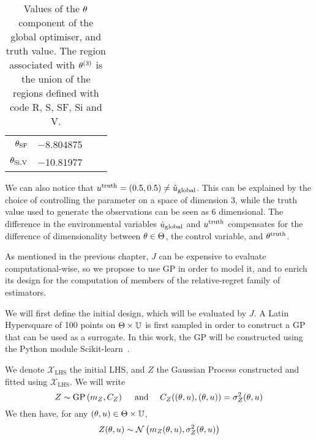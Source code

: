 \documentclass[../../Main_ManuscritThese.tex]{subfiles}
\begin{document}
\begin{table}[!h]
\begin{tabular}{rrrr}
    $\theta_{\mathrm{SF}}$   & \num[round-mode=places,round-precision=4]{-8.804875}                                                                                                                                                                                                                                        &                          &                                                                         \\
    $\theta_{\mathrm{Si,V}}$ & \num[round-mode=places,round-precision=4]{-10.81977}                                                                                                                                                                                                                                        &                          &                                                                         \\ \bottomrule
  \end{tabular}
  \caption[Values of the $\kk$ component of the global optimiser, and
  truth value]{\label{tab:ktruthkopt} Values of the $\kk$ component of
    the global optimiser, and truth value. The region associated with
    $\theta^{(3)}$ is the union of the regions defined with code R, S,
    SF, Si and V.}
\end{table}
We can also notice that
$u^{\mathrm{truth}}=(\num{0.5},\num{0.5}) \neq
\hat{u}_{\mathrm{global}}$. This can be explained by the choice of
controlling the parameter on a space of dimension 3, while the truth
value used to generate the observations can be seen as 6
dimensional. The difference in the environmental variables $\hat{u}_{\mathrm{global}}$ and
$u^{\mathrm{truth}}$ compensates for the
difference of dimensionality between $\theta\in\Theta$, the control
variable, and $\theta^{\mathrm{truth}}$.

As mentioned in the previous chapter, $J$ can be expensive to evaluate
computational-wise, so we propose to use GP in order to model it, and
to enrich its design for the computation of members of the
relative-regret family of estimators.

We will first define the initial design, which will be evaluated by
$J$. A Latin Hypersquare of \num{100} points on
$\Theta \times \mathbb{U}$ is first sampled in order to construct a GP
that can be used as a surrogate.  In this work, the GP will be
constructed using the Python module
Scikit-learn~\citep{pedregosa_scikit-learn_2011}.

We denote $\mathcal{X}_{\mathrm{LHS}}$ the initial LHS, and $Z$ the
Gaussian Process constructed and fitted using
$\mathcal{X}_{\mathrm{LHS}}$.  We will write
\begin{equation}
  Z \sim \operatorname{\mathrm{GP}}\left(m_Z, C_Z\right) \quad\text{ and } \quad C_Z((\theta, u),(\theta, u)) = \sigma^2_Z(\theta, u)
\end{equation}
We then have, for any $(\theta, u) \in \Theta\times\mathbb{U}$,
\begin{equation}
  Z(\theta, u) \sim \mathcal{N}\left(m_Z(\theta, u), \sigma^2_Z(\theta, u)\right)
\end{equation}
\end{document}
